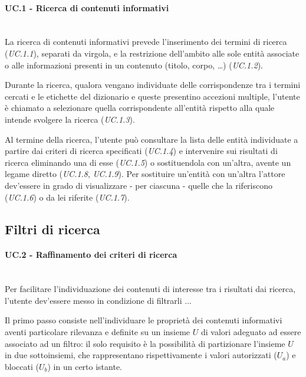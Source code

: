 \paragraph{UC.1 - Ricerca di contenuti informativi} \hfill \\
La ricerca di contenuti informativi prevede l'inserimento dei termini di ricerca (\textit{UC.1.1}), separati da virgola, e la restrizione dell'ambito alle sole entità associate o alle informazioni presenti in un contenuto (titolo, corpo, \ldots) (\textit{UC.1.2}).

Durante la ricerca, qualora vengano individuate delle corrispondenze tra i termini cercati e le etichette del dizionario e queste presentino accezioni multiple, l'utente è chiamato a selezionare quella corrispondente all'entità rispetto alla quale intende svolgere la ricerca (\textit{UC.1.3}).

Al termine della ricerca, l'utente può consultare la lista delle entità individuate a partire dai criteri di ricerca specificati (\textit{UC.1.4}) e intervenire sui risultati di ricerca eliminando una di esse (\textit{UC.1.5}) o sostituendola con un'altra, avente un legame diretto (\textit{UC.1.8}, \textit{UC.1.9}). Per sostituire un'entità con un'altra l'attore dev'essere in grado di visualizzare - per ciascuna - quelle che la riferiscono (\textit{UC.1.6}) o da lei riferite (\textit{UC.1.7}).
 
\subsection{Filtri di ricerca}

\paragraph{UC.2 - Raffinamento dei criteri di ricerca} \hfill \\
Per facilitare l'individuazione dei contenuti di interesse tra i risultati dai ricerca, l'utente dev'essere messo in condizione di filtrarli ...

Il primo passo consiste nell'individuare le proprietà dei contenuti informativi aventi particolare rilevanza e definite su un insieme $U$ di valori adeguato ad essere associato ad un filtro: il solo requisito è la possibilità di partizionare l'insieme $U$ in due sottoinsiemi, che rappresentano rispettivamente i valori autorizzati ($U_a$) e bloccati ($U_b$) in un certo istante.



